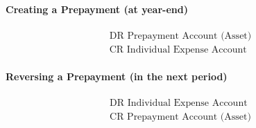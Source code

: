 \paragraph{Creating a Prepayment (at year-end)}
\[
\begin{aligned}
\text{DR Prepayment Account (Asset)} \\
\text{CR Individual Expense Account}
\end{aligned}
\]

\paragraph{Reversing a Prepayment (in the next period)}
\[
\begin{aligned}
\text{DR Individual Expense Account} \\
\text{CR Prepayment Account (Asset)}
\end{aligned}
\]
